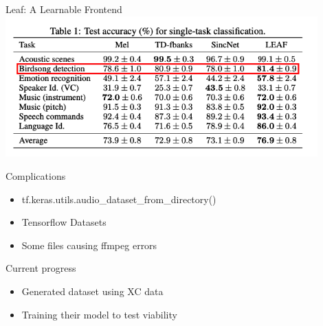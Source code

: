 \begin{frame}{Leaf: A Learnable Frontend}
    \centering
    \includegraphics[height=0.7\textheight,width=0.9\textwidth,keepaspectratio]{images/leaf_results_paper.png}
\end{frame}

\begin{frame}{Complications}
    \begin{itemize}
        \item tf.keras.utils.audio\_dataset\_from\_directory()
        \item Tensorflow Datasets
        \item Some files causing ffmpeg errors
    \end{itemize}
\end{frame}

\begin{frame}{Current progress}
    \begin{itemize}
        \item Generated dataset using XC data
        \item Training their model to test viability
    \end{itemize}
\end{frame}
